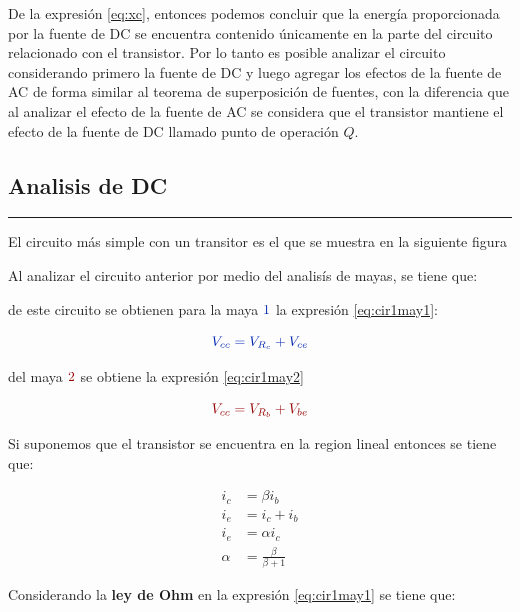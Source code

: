 \documentclass{article}
\begin{document}
De la expresión \eqref{eq:xc}, entonces podemos concluir que la energía
proporcionada por la fuente de DC se encuentra contenido únicamente en
la parte del circuito relacionado con el transistor. Por lo tanto es
posible analizar el circuito considerando primero la fuente de DC y
luego agregar los efectos de la fuente de AC de forma similar al teorema
de superposición de fuentes, con la diferencia que al analizar el efecto
de la fuente de AC se considera que el transistor mantiene el efecto de
la fuente de DC llamado punto de operación $Q$.

    \subsection{Analisis de DC}\label{analisis-de-dc}

\begin{center}\rule{3in}{0.4pt}\end{center}

El circuito más simple con un transitor es el que se muestra en la
siguiente figura

Al analizar el circuito anterior por medio del analisís de mayas, se
tiene que:

de este circuito se obtienen para la maya $\color{blue}{1}$ la expresión
\eqref{eq:cir1may1}:

\begin{equation}\label{eq:cir1may1}
\color{blue}{V_{cc}=V_{R_{c}}+V_{ce}}
\end{equation}

del maya $\color{red}{2}$ se obtiene la expresión \eqref{eq:cir1may2}

\begin{equation}\label{eq:cir1may2}
\color{red}{V_{cc}=V_{R_{b}}+V_{be}}
\end{equation}

Si suponemos que el transistor se encuentra en la region lineal entonces
se tiene que:

\[
\begin{align}
\label{eq:ic} i_{c} &= \beta i_{b}  \\
\label{eq:Ie} i_{e} & = i_{c} + i_{b} \\
\label{eq:icIe} i_{e} & = \alpha i_{c}   \\ 
\label{eq:alhpa} \alpha & = \frac{\beta}{\beta+1} 
\end{align}
\]

Considerando la \textbf{ley de Ohm} en la expresión \eqref{eq:cir1may1}
se tiene que:
\end{document}
